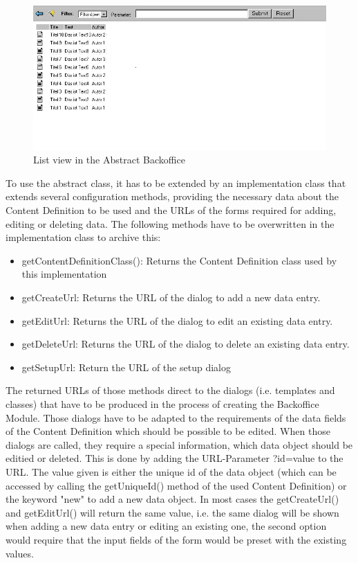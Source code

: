 \begin{figure}
\begin{center}
\includegraphics[clip,width=\sgw]{pics/backOffice/list}
\end{center}
\caption[List view in the Abstract Backoffice]
	{List view in the Abstract Backoffice}
\label{AbstactBO}\jtabd
\end{figure}

To use the abstract class, it has to be extended by an implementation
class that extends several configuration methods, providing the
necessary data about the Content Definition to be used and the URLs of
the forms required for adding, editing or deleting data. The following
methods have to be overwritten in the implementation class to archive
this:
\begin{itemize}
\item getContentDefinitionClass(): Returns the Content Definition
class used by this implementation
\item getCreateUrl: Returns the URL of the dialog to add a new data
entry.
\item getEditUrl: Returns the URL of the dialog to edit an existing
data entry.
\item getDeleteUrl: Returns the URL of the dialog to delete an
existing data entry.
\item getSetupUrl: Return the URL of the setup dialog
\end{itemize}

The returned URLs of those methods direct to the dialogs (i.e. templates
and classes) that have to be produced in the process of creating the
Backoffice Module. Those dialogs have to be adapted to the requirements
of the data fields of the Content Definition which should be possible to
be edited. When those dialogs are called, they require a special
information, which data object should be editied or deleted.
This is done by adding the URL-Parameter {\code ?id=value} to the URL. The value
given is either the unique id of the data object (which can be accessed
by calling  the {\meth getUniqueId()} method of the used Content Definition) or
the keyword "new" to add a new data object.
In most cases the {\meth getCreateUrl()} and {\meth getEditUrl()} will return the same
value, i.e. the same dialog will be shown when adding a new data entry
or editing an existing one, the second option would require that the
input fields of the form would be preset with the existing values.

